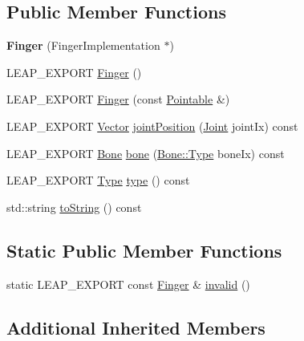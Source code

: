 \subsection*{Public Member Functions}
\begin{DoxyCompactItemize}
\item 
\mbox{\label{class_leap_1_1_finger_ac393e4d718a2163fabd65b85d5c09267}} 
{\bfseries Finger} (Finger\+Implementation $\ast$)
\item 
L\+E\+A\+P\+\_\+\+E\+X\+P\+O\+RT \hyperlink{class_leap_1_1_finger_aed76c909a2904029d313538e01604c88}{Finger} ()
\item 
L\+E\+A\+P\+\_\+\+E\+X\+P\+O\+RT \hyperlink{class_leap_1_1_finger_a864d7de003b2d5b6d738c67da322e702}{Finger} (const \hyperlink{class_leap_1_1_pointable}{Pointable} \&)
\item 
L\+E\+A\+P\+\_\+\+E\+X\+P\+O\+RT \hyperlink{struct_leap_1_1_vector}{Vector} \hyperlink{class_leap_1_1_finger_a8f50342f74888b3628ffb7aeadcfe0b5}{joint\+Position} (\hyperlink{class_leap_1_1_finger_ac49e756a0440cb5b75a9ad7838f08137}{Joint} joint\+Ix) const
\item 
L\+E\+A\+P\+\_\+\+E\+X\+P\+O\+RT \hyperlink{class_leap_1_1_bone}{Bone} \hyperlink{class_leap_1_1_finger_aae013ec7b81ae141042ae64c15331e30}{bone} (\hyperlink{class_leap_1_1_bone_ac2f949e05b22edc21a308df42580b5e1}{Bone\+::\+Type} bone\+Ix) const
\item 
L\+E\+A\+P\+\_\+\+E\+X\+P\+O\+RT \hyperlink{class_leap_1_1_finger_a1e94681e6d2168b2f854fcad7c8ac483}{Type} \hyperlink{class_leap_1_1_finger_a1fcede81ae68fa7060eeae5a6961edcc}{type} () const
\item 
std\+::string \hyperlink{class_leap_1_1_finger_aaccf83b863c7cdbf820ed991d4a8faa1}{to\+String} () const
\end{DoxyCompactItemize}
\subsection*{Static Public Member Functions}
\begin{DoxyCompactItemize}
\item 
static L\+E\+A\+P\+\_\+\+E\+X\+P\+O\+RT const \hyperlink{class_leap_1_1_finger}{Finger} \& \hyperlink{class_leap_1_1_finger_a2dec17262f38e1bb548da99086c5e8e3}{invalid} ()
\end{DoxyCompactItemize}
\subsection*{Additional Inherited Members}


